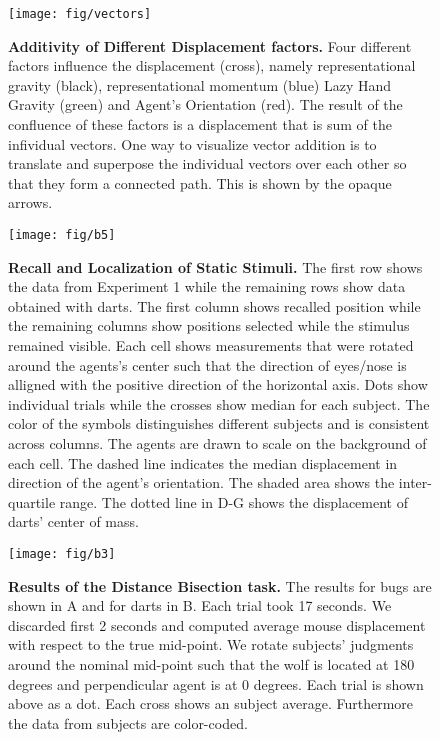 \documentclass[10pt]{article}
\begin{document}
\begin{figure}[!ht]
\begin{center}
\texttt{[image: fig/vectors]}
\end{center}
\caption{
{\bf Additivity of Different Displacement factors.}
Four different factors influence the displacement (cross), namely representational gravity (black), representational momentum (blue) Lazy Hand Gravity (green) and Agent's Orientation (red). The result of the confluence of these factors is a displacement that is sum of the infividual vectors. One way to visualize vector addition is to translate and superpose the individual vectors over each other so that they form a connected path. This is shown by the opaque arrows.  
}\label{fig:vec}
\end{figure}

\begin{figure}[!ht]
\begin{center}
\texttt{[image: fig/b5]}
\end{center}
\caption{
{\bf Recall and Localization of Static Stimuli.}
The first row shows the data from Experiment 1 while the remaining rows show data obtained with darts. 
The first column shows recalled position while the remaining columns show positions selected while the stimulus remained visible.
Each cell shows measurements that were rotated around the agents's center such that the direction of eyes/nose is alligned with the positive direction of the horizontal axis.  
Dots show individual trials while the crosses show median for each subject.  
The color of the symbols distinguishes different subjects and is consistent across columns.
The agents are drawn to scale on the background of each cell.  
The dashed line indicates the median displacement in direction of the agent's orientation. 
The shaded area shows the inter-quartile range. 
The dotted line in D-G shows the displacement of darts' center of mass.
}
\label{fig:b5}
\end{figure}

\begin{figure}[!ht]
\begin{center}
\texttt{[image: fig/b3]}
\end{center}
\caption{
{\bf Results of the Distance Bisection task.}
The results for bugs are shown in A and for darts in B.
Each trial took 17 seconds. We discarded first 2 seconds and computed average mouse displacement with respect to the true mid-point. We 
rotate subjects' judgments around the nominal mid-point such that the wolf is located at 180 degrees and perpendicular agent is at 0 degrees. Each trial is shown above as a dot. Each cross shows an subject average. Furthermore the data from subjects are color-coded.
}
\label{fig:b3}
\end{figure}
\end{document}
